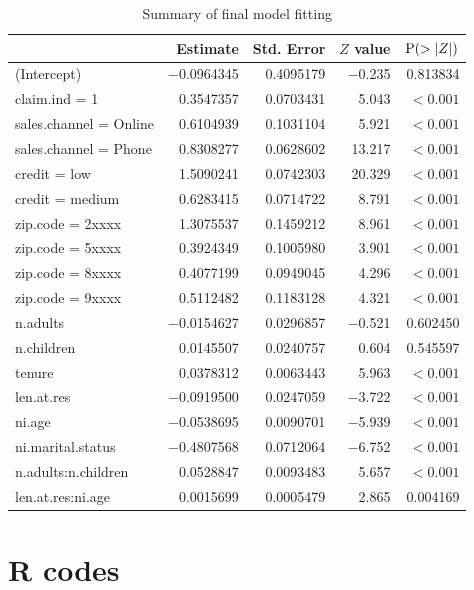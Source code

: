 \documentclass[12pt]{amsart}
\theoremstyle{definition}
\theoremstyle{remark}
\numberwithin{equation}{section}
\renewcommand{\P}{\textnormal{P}}
\begin{document}
\begin{table}[!h]
	\scriptsize
	\caption{Summary of final model fitting}
	\begin{tabular}{l | r r r r}
		\hline
		&Estimate &Std. Error &$Z$ value &$\P(>|Z|)$    \\ \hline
		(Intercept)          &$-$0.0964345  &0.4095179  &$-$0.235 &0.813834    \\
		claim.ind = 1   &0.3547357  &0.0703431   &5.043 &$<0.001$ \\ 
		sales.channel = Online  &0.6104939  &0.1031104   &5.921 &$<0.001$ \\
		sales.channel = Phone   &0.8308277  &0.0628602  &13.217  &$<0.001$\\
		credit = low            &1.5090241  &0.0742303  &20.329  &$<0.001$\\
		credit = medium         &0.6283415  &0.0714722   &8.791  &$<0.001$\\
		zip.code = 2xxxx    &1.3075537  &0.1459212   &8.961  &$<0.001$\\
		zip.code = 5xxxx    &0.3924349  &0.1005980   &3.901 &$<0.001$ \\
		zip.code = 8xxxx    &0.4077199  &0.0949045   &4.296 &$<0.001$ \\
		zip.code = 9xxxx    &0.5112482  &0.1183128   &4.321 &$<0.001$ \\
		n.adults             &$-$0.0154627  &0.0296857  &$-$0.521 &0.602450    \\
		n.children           &0.0145507  &0.0240757   &0.604 &0.545597    \\
		tenure               &0.0378312  &0.0063443   &5.963 &$<0.001$ \\
		len.at.res           &$-$0.0919500  &0.0247059  &$-$3.722 &$<0.001$ \\
		ni.age               &$-$0.0538695  &0.0090701  &$-$5.939 &$<0.001$ \\
		ni.marital.status    &$-$0.4807568  &0.0712064  &$-$6.752 &$<0.001$ \\
		n.adults:n.children  &0.0528847  &0.0093483   &5.657 &$<0.001$ \\
		len.at.res:ni.age    &0.0015699  &0.0005479   &2.865 &0.004169 \\
	\end{tabular}
\end{table}

\section{R codes}


\end{document}
